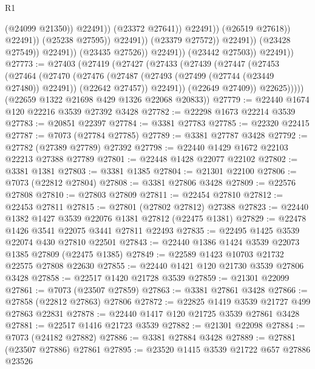 \begin{lexlean}{R1}
\begin{coremodule}
                                                    (@24099 @21350))
                                                  @22491))
                                              (@23372 @27641))
                                            @22491))
                                        (@26519 @27618))
                                      @22491))
                                  (@25238 @27595))
                                @22491))
                            (@23379 @27572))
                          @22491))
                      (@23428 @27549))
                    @22491))
                (@23435 @27526))
              @22491))
          (@23442 @27503))
        @22491))
@27773 := @27403
    (@27419
      (@27427
        (@27433
          (@27439
            (@27447
              (@27453
                (@27464
                  (@27470
                    (@27476
                      (@27487 (@27493 (@27499 (@27744 (@23449 @27480)) @22491)) (@22642 @27457))
                      @22491))
                  (@22649 @27409))
                @22625)))))
      (@22659 @1322 @21698 @429 @1326 @22068 @20833))
@27779 := @22440 @1674 @120 @22216 @3539 @27392 @3428
@27782 := @22298 @1673 @22214 @3539
@27783 := @20851 @22397
@27784 := @3381 @27783
@27785 := @22320 @22415
@27787 := @7073 (@27784 @27785)
@27789 := @3381 @27787 @3428
@27792 := @27782 (@27389 @27789) @27392
@27798 := @22440 @1429 @1672 @22103 @22213 @27388 @27789
@27801 := @22448 @1428 @22077 @22102
@27802 := @3381 @1381
@27803 := @3381 @1385
@27804 := @21301 @22100
@27806 := @7073 (@22812 @27804)
@27808 := @3381 @27806 @3428
@27809 := @22576 @27808
@27810 := @27803 @27809
@27811 := @22454 @27810
@27812 := @22453 @27811
@27815 := @27801 (@27802 @27812) @27388
@27823 := @22440 @1382 @1427 @3539 @22076 @1381 @27812 (@22475 @1381)
@27829 := @22478 @1426 @3541 @22075 @3441 @27811 @22493
@27835 := @22495 @1425 @3539 @22074 @430 @27810 @22501
@27843 := @22440 @1386 @1424 @3539 @22073 @1385 @27809 (@22475 @1385)
@27849 := @22589 @1423 @10703 @21732 @22575 @27808 @22630
@27855 := @22440 @1421 @120 @21730 @3539 @27806 @3428
@27858 := @22517 @1420 @21728 @3539
@27859 := @21301 @22099
@27861 := @7073 (@23507 @27859)
@27863 := @3381 @27861 @3428
@27866 := @27858 (@22812 @27863) @27806
@27872 := @22825 @1419 @3539 @21727 @499 @27863 @22831
@27878 := @22440 @1417 @120 @21725 @3539 @27861 @3428
@27881 := @22517 @1416 @21723 @3539
@27882 := @21301 @22098
@27884 := @7073 (@24182 @27882)
@27886 := @3381 @27884 @3428
@27889 := @27881 (@23507 @27886) @27861
@27895 := @23520 @1415 @3539 @21722 @657 @27886 @23526

\end{coremodule}
\end{lexlean}
